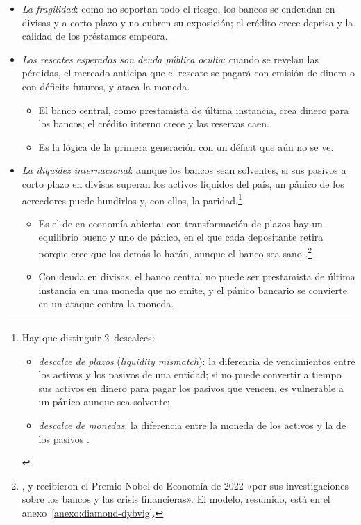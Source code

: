 \documentclass[11pt]{article}
\begin{document}
\begin{itemize}
\item \emph{La fragilidad}: como no soportan todo el riesgo, los bancos se endeudan en divisas y a corto plazo y no cubren su exposición; el crédito crece deprisa y la calidad de los préstamos empeora.
\item \emph{Los rescates esperados son deuda pública oculta}: cuando se revelan las pérdidas, el mercado anticipa que el rescate se pagará con emisión de dinero o con déficits futuros, y ataca la moneda.
  \begin{itemize}
  \item El banco central, como prestamista de última instancia, crea dinero para los bancos; el crédito interno crece y las reservas caen.
  \item Es la lógica de la primera generación con un déficit que aún no se ve\nocite{CPR1999PaperTigers,BER2001Prospective}.
  \end{itemize}
\item \emph{La iliquidez internacional}: aunque los bancos sean solventes, si sus pasivos a corto plazo en divisas superan los activos líquidos del país, un pánico de los acreedores puede hundirlos y, con ellos, la paridad\nocite{ChangVelasco2001Model}.\footnote{Hay que distinguir 2~descalces:
\begin{itemize}
\item \emph{descalce de plazos} (\emph{liquidity mismatch}): la diferencia de vencimientos entre los activos y los pasivos de una entidad; si no puede convertir a tiempo sus activos en dinero para pagar los pasivos que vencen, es vulnerable a un pánico aunque sea solvente;
\item \emph{descalce de monedas}: la diferencia entre la moneda de los activos y la de los pasivos .
\end{itemize}}
  \begin{itemize}
  \item Es el  de \textcite{DiamondDybvig1983Bank} en economía abierta: con transformación de plazos hay un equilibrio bueno y uno de pánico, en el que cada depositante retira porque cree que los demás lo harán, aunque el banco sea sano  .\footnote{,  y  recibieron el Premio Nobel de Economía de 2022 «por sus investigaciones sobre los bancos y las crisis financieras»\nocite{Nobel2022Bancos,Repullo2022Nobel}. El modelo, resumido, está en el anexo~\ref{anexo:diamond-dybvig}.}
  \item Con deuda en divisas, el banco central no puede ser prestamista de última instancia en una moneda que no emite, y el pánico bancario se convierte en un ataque contra la moneda.
  \end{itemize}
\end{itemize}
\end{document}
